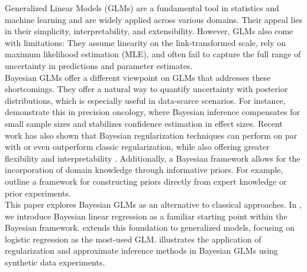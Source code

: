 Generalized Linear Models (GLMs) are a fundamental tool in statistics and machine learning and are widely applied across various domains.
Their appeal lies in their simplicity, interpretability, and extensibility.
However, GLMs also come with limitations:
They assume linearity on the link-transformed scale, rely on maximum likelihood estimation (MLE), and often fail to capture the full range of uncertainty in predictions and parameter estimates.\\

Bayesian GLMs offer a different viewpoint on GLMs that addresses these shortcomings.
They offer a natural way to quantify uncertainty with posterior distributions, which is especially useful in data-scarce scenarios.
For instance, \citet{sondhi_bayesian_2021} demonstrate this in precision oncology, where Bayesian inference compensates for small sample sizes and stabilizes confidence estimation in effect sizes.
Recent work has also shown that Bayesian regularization techniques can perform on par with or even outperform classic regularization, while also offering greater flexibility and interpretability \citep[see e.g.][]{van_erp_shrinkage_2019,celeux_regularization_2012}.
Additionally, a Bayesian framework allows for the incorporation of domain knowledge through informative priors.
For example, \citet{chien_informative_2023} outline a framework for constructing priors directly from expert knowledge or prior experiments.\\

This paper explores Bayesian GLMs as an alternative to classical approaches.
In , we introduce Bayesian linear regression as a familiar starting point within the Bayesian framework.
 extends this foundation to generalized models, focusing on logistic regression as the most-used GLM.
 illustrates the application of regularization and approximate inference methods in Bayesian GLMs using synthetic data experiments.\\



